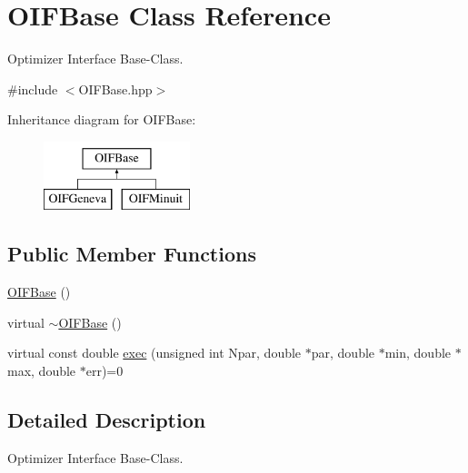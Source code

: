\hypertarget{classOIFBase}{
\section{OIFBase Class Reference}
\label{d0/d31/classOIFBase}
}


Optimizer Interface Base-\/Class.  




{\ttfamily \#include $<$OIFBase.hpp$>$}

Inheritance diagram for OIFBase:\begin{figure}[H]
\begin{center}
\leavevmode
\includegraphics[height=2.000000cm]{d0/d31/classOIFBase}
\end{center}
\end{figure}
\subsection*{Public Member Functions}
\begin{DoxyCompactItemize}
\item 
\hyperlink{classOIFBase_a1e964e846b32437d0009bbd924caae72}{OIFBase} ()
\item 
virtual \hyperlink{classOIFBase_ad39d706bbab59c376437b592db1164ff}{$\sim$OIFBase} ()
\item 
virtual const double \hyperlink{classOIFBase_acc6067869ca4adf70f00075196c5ebdf}{exec} (unsigned int Npar, double $\ast$par, double $\ast$min, double $\ast$max, double $\ast$err)=0
\end{DoxyCompactItemize}


\subsection{Detailed Description}
Optimizer Interface Base-\/Class. 

